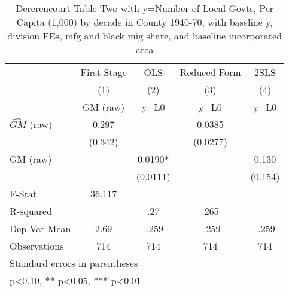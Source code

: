 \begin{table}[htbp]\centering
\def\sym#1{\ifmmode^{#1}\else\(^{#1}\)\fi}
\caption{Dererencourt Table Two with y=Number of Local Govts, Per Capita (1,000) by decade in County 1940-70, with baseline y, division FEs, mfg and black mig share, and baseline incorporated area}
\begin{tabular}{l*{4}{c}}
\toprule
                    & First Stage   &         OLS   &Reduced Form   &        2SLS   \\
                    &\multicolumn{1}{c}{(1)}&\multicolumn{1}{c}{(2)}&\multicolumn{1}{c}{(3)}&\multicolumn{1}{c}{(4)}\\
                    &\multicolumn{1}{c}{GM  (raw)}&\multicolumn{1}{c}{y\_L0}&\multicolumn{1}{c}{y\_L0}&\multicolumn{1}{c}{y\_L0}\\
\midrule
$\hat{GM}$ (raw)    &       0.297   &               &      0.0385   &               \\
                    &     (0.342)   &               &    (0.0277)   &               \\
\addlinespace
GM  (raw)           &               &      0.0190*  &               &       0.130   \\
                    &               &    (0.0111)   &               &     (0.154)   \\
\midrule
F-Stat              &      36.117   &               &               &               \\
R-squared           &               &         .27   &        .265   &               \\
Dep Var Mean        &        2.69   &       -.259   &       -.259   &       -.259   \\
Observations        &         714   &         714   &         714   &         714   \\
\bottomrule
\multicolumn{5}{l}{\footnotesize Standard errors in parentheses}\\
\multicolumn{5}{l}{\footnotesize * p<0.10, ** p<0.05, *** p<0.01}\\
\end{tabular}
\end{table}

